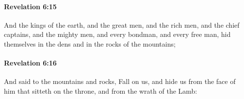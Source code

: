 		\paragraph{Revelation 6:15} %
			\label{REVELATIONNT-6-15}

			And the kings of the earth, and the great men, and the rich men, and the chief captains, and the mighty men, and every bondman, and every free man, hid themselves in the dens and in the rocks of the mountains;

			\begin{framed}
			\scriptsize
				\begin{compactdesc}
					\item[SBLG] 
				\end{compactdesc}
			\end{framed}

		\paragraph{Revelation 6:16} %
			\label{REVELATIONNT-6-16}

			And said to the mountains and rocks, Fall on us, and hide us from the face of him that sitteth on the throne, and from the wrath of the Lamb:

